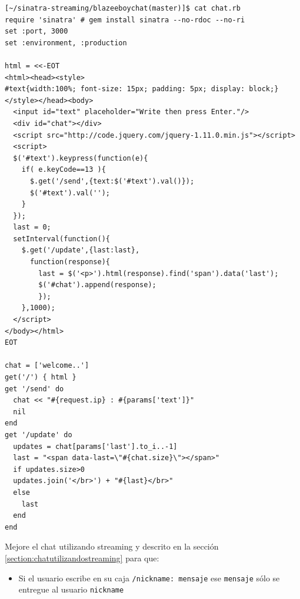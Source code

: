 \begin{verbatim}
[~/sinatra-streaming/blazeeboychat(master)]$ cat chat.rb 
require 'sinatra' # gem install sinatra --no-rdoc --no-ri
set :port, 3000
set :environment, :production
 
html = <<-EOT
<html><head><style>
#text{width:100%; font-size: 15px; padding: 5px; display: block;}
</style></head><body>
  <input id="text" placeholder="Write then press Enter."/>
  <div id="chat"></div>
  <script src="http://code.jquery.com/jquery-1.11.0.min.js"></script>
  <script>
  $('#text').keypress(function(e){
    if( e.keyCode==13 ){
      $.get('/send',{text:$('#text').val()});
      $('#text').val('');
    }
  });
  last = 0;
  setInterval(function(){
    $.get('/update',{last:last},
      function(response){
        last = $('<p>').html(response).find('span').data('last');
        $('#chat').append(response);
        });
    },1000);
  </script>
</body></html>
EOT
 
chat = ['welcome..']
get('/') { html }
get '/send' do
  chat << "#{request.ip} : #{params['text']}"
  nil
end
get '/update' do
  updates = chat[params['last'].to_i..-1]
  last = "<span data-last=\"#{chat.size}\"></span>"
  if updates.size>0
  updates.join('</br>') + "#{last}</br>"
  else
    last
  end
end
\end{verbatim}

\label{practica:chat_con_mensajes_uno_uno}
Mejore el chat utilizando streaming y  descrito en la sección
\ref{section:chatutilizandostreaming} para que:
\begin{itemize}
\item
Si el usuario escribe en su caja \verb|/nickname: mensaje| ese \verb|mensaje| sólo se entregue 
al usuario \verb|nickname|
\end{itemize}

